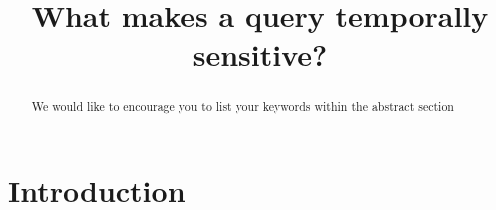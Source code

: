 \documentclass[runningheads,a4paper]{llncs}
\newcommand{\keywords}[1]{\par\addvspace\baselineskip
\noindent\keywordname\enspace\ignorespaces#1}
\begin{document}
\mainmatter  %

\title{What makes a query temporally sensitive?}


%
%

%
\authorrunning{}


%
%

\maketitle


\begin{abstract}
\keywords{We would like to encourage you to list your keywords within
the abstract section}
\end{abstract}


\section{Introduction}
\end{document}
